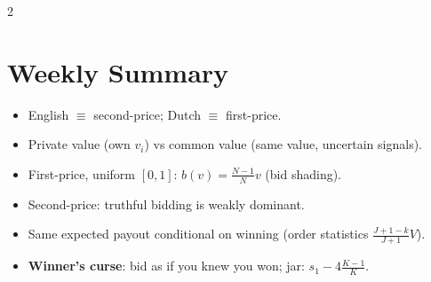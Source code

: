 \documentclass[a4paper,9pt]{extarticle}
\begin{document}
\begin{multicols}{2}
\section{Weekly Summary}


\begin{summary}

\begin{itemize}

\item English $\equiv$ second-price; Dutch $\equiv$ first-price.

\item Private value (own $v_i$) vs common value (same value, uncertain signals).

\item First-price, uniform $[0,1]$: $b(v) = \frac{N-1}{N} v$ (bid shading).

\item Second-price: truthful bidding is weakly dominant.

\item Same expected payout conditional on winning (order statistics
$\frac{J+1-k}{J+1}V$).

\item \textbf{Winner's curse}: bid as if you knew you won; jar: $s_1 - 4\frac{K-1}{K}$.

\end{itemize}

\end{summary}



\end{multicols}
\end{document}

